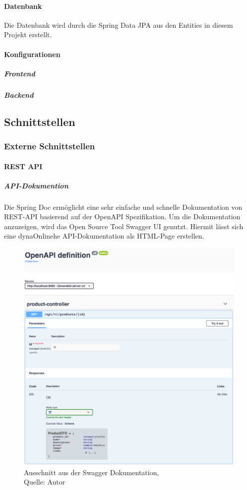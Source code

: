 \paragraph{Datenbank}
Die Datenbank wird durch die Spring Data JPA aus den Entities in diesem Projekt erstellt. 
\paragraph{Konfigurationen}
\subparagraph{Frontend}

\newpage
\subparagraph{Backend}
\newpage
\subsection{Schnittstellen}

\subsubsection{Externe Schnittstellen}
\paragraph{REST API}
\subparagraph{API-Dokumention}
Die Spring Doc ermöglicht eine sehr einfache und schnelle Dokumentation von REST-API basierend auf der OpenAPI Spezifikation. Um die Dokumentation anzuzeigen, wird das Open Source Tool Swagger UI genutzt. Hiermit lässt sich eine dynaOnlinehe API-Dokumentation als HTML-Page erstellen. 
\begin{figure}[H]
	\centering
	\includegraphics[scale=0.3]{images/swaggerui.png}
	\caption[Ausschnitt aus der Swagger Dokumentation]{Ausschnitt aus der Swagger Dokumentation,\\ Quelle: Autor}
	\label{img: swaggerUI}
\end{figure}
